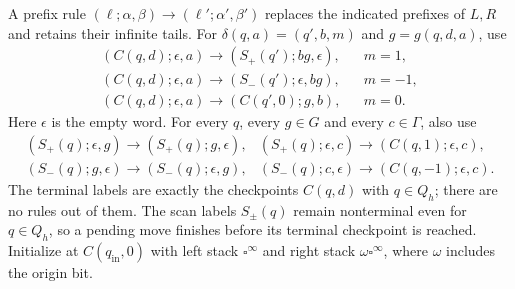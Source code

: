 A prefix rule $(\ell;\alpha,\beta)\to(\ell';\alpha',\beta')$ replaces the indicated prefixes of $L,R$ and retains their infinite tails. For $\delta(q,a)=(q',b,m)$ and $g=g(q,d,a)$, use
\begin{equation}\label{bcs:prefix-work-rules}
\begin{array}{lll}
 (C(q,d);\epsilon,a)\to(S_+(q');bg,\epsilon),& &m=1,\\
 (C(q,d);\epsilon,a)\to(S_-(q');\epsilon,bg),&&m=-1,\\
 (C(q,d);\epsilon,a)\to(C(q',0);g,b),&&m=0.
\end{array}
\end{equation}
Here $\epsilon$ is the empty word. For every $q$, every $g\in G$ and every $c\in\Gamma$, also use
\begin{equation}\label{bcs:prefix-scan-rules}
\begin{array}{ll}
 (S_+(q);\epsilon,g)\to(S_+(q);g,\epsilon),&
 (S_+(q);\epsilon,c)\to(C(q,1);\epsilon,c),\\
 (S_-(q);g,\epsilon)\to(S_-(q);\epsilon,g),&
 (S_-(q);c,\epsilon)\to(C(q,-1);\epsilon,c).
\end{array}
\end{equation}
The terminal labels are exactly the checkpoints $C(q,d)$ with $q\in Q_h$;
there are no rules out of them. The scan labels $S_\pm(q)$ remain
nonterminal even for $q\in Q_h$, so a pending move finishes before its
terminal checkpoint is reached. Initialize at $C(q_{\mathrm{in}},0)$ with
left stack $\square^\infty$ and right stack $\omega\square^\infty$, where
$\omega$ includes the origin bit.

